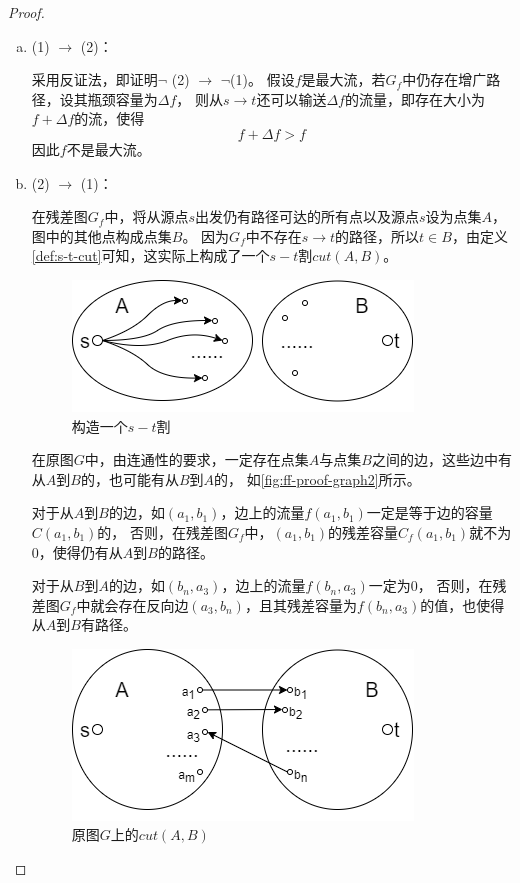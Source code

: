 \begin{proof}
	\begin{enumerate}[a)]
		\item (1) $\rightarrow$ (2)：

			采用反证法，即证明$\neg$ (2) $\rightarrow$ $\neg$(1)。
			假设\(f\)是最大流，若\(G_f\)中仍存在增广路径，设其瓶颈容量为\(\Delta f\)，
			则从\(s \to t\)还可以输送\(\Delta f\)的流量，即存在大小为\(f + \Delta f\)的流，使得
			\begin{equation}\nonumber
				f + \Delta f > f
			\end{equation}
			因此\(f\)不是最大流。
		\item (2) $\rightarrow$ (1)：

			在残差图\(G_f\)中，将从源点\(s\)出发仍有路径可达的所有点以及源点\(s\)设为点集\(A\)，图中的其他点构成点集\(B\)。
			因为\(G_f\)中不存在\(s \to t\)的路径，所以\(t \in B\)，由定义\ref{def:s-t-cut}可知，这实际上构成了一个\(s-t\)割\(cut(A,B)\)。
			\begin{figure}[hbt]
				\centering
				\includegraphics[scale=0.5]{image/network-flow-ff-proof-graph1.png}
				\caption{构造一个\(s-t\)割}\label{fig:ff-proof-graph1}
			\end{figure}

			在原图\(G\)中，由连通性的要求，一定存在点集\(A\)与点集\(B\)之间的边，这些边中有从\(A\)到\(B\)的，也可能有从\(B\)到\(A\)的，
			如\autoref{fig:ff-proof-graph2}所示。
			
			对于从\(A\)到\(B\)的边，如\((a_1,b_1)\)，边上的流量\(f(a_1,b_1)\)一定是等于边的容量\(C(a_1,b_1)\)的，
			否则，在残差图\(G_f\)中，\((a_1,b_1)\)的残差容量\(C_f(a_1,b_1)\)就不为0，使得仍有从\(A\)到\(B\)的路径。
			
			对于从\(B\)到\(A\)的边，如\((b_n,a_3)\)，边上的流量\(f(b_n,a_3)\)一定为0，
			否则，在残差图\(G_f\)中就会存在反向边\((a_3,b_n)\)，且其残差容量为\(f(b_n,a_3)\)的值，也使得从\(A\)到\(B\)有路径。
			\begin{figure}[hbt]
				\centering
				\includegraphics[scale=0.5]{image/network-flow-ff-proof-graph2.png}
				\caption{原图\(G\)上的\(cut(A,B)\)}\label{fig:ff-proof-graph2}
			\end{figure}


\end{enumerate}
\end{proof}
